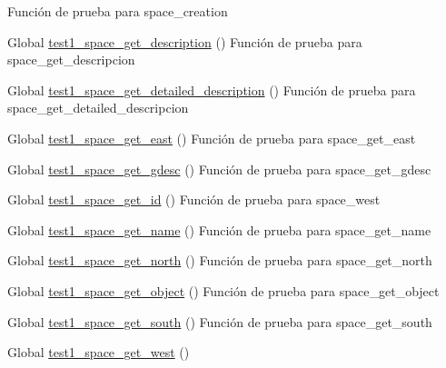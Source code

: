 \begin{DoxyRefList}
%
Función de prueba para space\+\_\+creation  
\item[Global \mbox{\hyperlink{space__test_8c_a9a9da97ed6f49f2ae325177caecfea9c}{test1\+\_\+space\+\_\+get\+\_\+description}} ()]\label{test__test000261}%
%
Función de prueba para space\+\_\+get\+\_\+descripcion  
\item[Global \mbox{\hyperlink{space__test_8c_ab00e408d268230a4ebfa789ce2fba104}{test1\+\_\+space\+\_\+get\+\_\+detailed\+\_\+description}} ()]\label{test__test000266}%
%
Función de prueba para space\+\_\+get\+\_\+detailed\+\_\+descripcion  
\item[Global \mbox{\hyperlink{space__test_8c_a354adb2722b06ec65b7212d2736d6417}{test1\+\_\+space\+\_\+get\+\_\+east}} ()]\label{test__test000243}%
%
Función de prueba para space\+\_\+get\+\_\+east  
\item[Global \mbox{\hyperlink{space__test_8c_a3b6d16613ee2f3940fe7c92f3934508a}{test1\+\_\+space\+\_\+get\+\_\+gdesc}} ()]\label{test__test000256}%
%
Función de prueba para space\+\_\+get\+\_\+gdesc  
\item[Global \mbox{\hyperlink{space__test_8c_a920df9e02482f4f1e6a5ebcaec523860}{test1\+\_\+space\+\_\+get\+\_\+id}} ()]\label{test__test000233}%
%
Función de prueba para space\+\_\+west  
\item[Global \mbox{\hyperlink{space__test_8c_ad12c42523c517507566c5c68b1527689}{test1\+\_\+space\+\_\+get\+\_\+name}} ()]\label{test__test000237}%
%
Función de prueba para space\+\_\+get\+\_\+name  
\item[Global \mbox{\hyperlink{space__test_8c_a3a87f1e1e173d622bfbd3bcd14e060ca}{test1\+\_\+space\+\_\+get\+\_\+north}} ()]\label{test__test000239}%
%
Función de prueba para space\+\_\+get\+\_\+north  
\item[Global \mbox{\hyperlink{space__test_8c_a4a1ca89fa511c04bb07c14edb19c17ba}{test1\+\_\+space\+\_\+get\+\_\+object}} ()]\label{test__test000247}%
%
Función de prueba para space\+\_\+get\+\_\+object  
\item[Global \mbox{\hyperlink{space__test_8c_a8e345065f58565e131bdb3a9d0096ed5}{test1\+\_\+space\+\_\+get\+\_\+south}} ()]\label{test__test000241}%
%
Función de prueba para space\+\_\+get\+\_\+south  
\item[Global \mbox{\hyperlink{space__test_8c_a1f08c6866885bfc093717f57b1b86539}{test1\+\_\+space\+\_\+get\+\_\+west}} ()]\label{test__test000245}%

\end{DoxyRefList}

